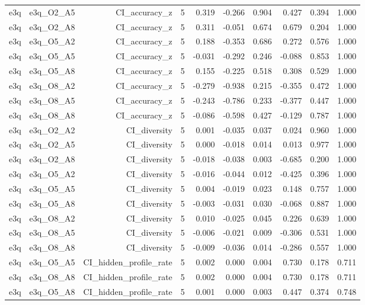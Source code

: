 \documentclass[11pt]{article}
\begin{document}
\begin{landscape}
\begin{longtable}{@{}lrrrrrrrrr@{}}
e3q & e3q\_O2\_A5 & CI\_accuracy\_z & 5 & 0.319 & -0.266 & 0.904 & 0.427 & 0.394 & 1.000 \\
e3q & e3q\_O2\_A8 & CI\_accuracy\_z & 5 & 0.311 & -0.051 & 0.674 & 0.679 & 0.204 & 1.000 \\
e3q & e3q\_O5\_A2 & CI\_accuracy\_z & 5 & 0.188 & -0.353 & 0.686 & 0.272 & 0.576 & 1.000 \\
e3q & e3q\_O5\_A5 & CI\_accuracy\_z & 5 & -0.031 & -0.292 & 0.246 & -0.088 & 0.853 & 1.000 \\
e3q & e3q\_O5\_A8 & CI\_accuracy\_z & 5 & 0.155 & -0.225 & 0.518 & 0.308 & 0.529 & 1.000 \\
e3q & e3q\_O8\_A2 & CI\_accuracy\_z & 5 & -0.279 & -0.938 & 0.215 & -0.355 & 0.472 & 1.000 \\
e3q & e3q\_O8\_A5 & CI\_accuracy\_z & 5 & -0.243 & -0.786 & 0.233 & -0.377 & 0.447 & 1.000 \\
e3q & e3q\_O8\_A8 & CI\_accuracy\_z & 5 & -0.086 & -0.598 & 0.427 & -0.129 & 0.787 & 1.000 \\
e3q & e3q\_O2\_A2 & CI\_diversity & 5 & 0.001 & -0.035 & 0.037 & 0.024 & 0.960 & 1.000 \\
e3q & e3q\_O2\_A5 & CI\_diversity & 5 & 0.000 & -0.018 & 0.014 & 0.013 & 0.977 & 1.000 \\
e3q & e3q\_O2\_A8 & CI\_diversity & 5 & -0.018 & -0.038 & 0.003 & -0.685 & 0.200 & 1.000 \\
e3q & e3q\_O5\_A2 & CI\_diversity & 5 & -0.016 & -0.044 & 0.012 & -0.425 & 0.396 & 1.000 \\
e3q & e3q\_O5\_A5 & CI\_diversity & 5 & 0.004 & -0.019 & 0.023 & 0.148 & 0.757 & 1.000 \\
e3q & e3q\_O5\_A8 & CI\_diversity & 5 & -0.003 & -0.031 & 0.030 & -0.068 & 0.887 & 1.000 \\
e3q & e3q\_O8\_A2 & CI\_diversity & 5 & 0.010 & -0.025 & 0.045 & 0.226 & 0.639 & 1.000 \\
e3q & e3q\_O8\_A5 & CI\_diversity & 5 & -0.006 & -0.021 & 0.009 & -0.306 & 0.531 & 1.000 \\
e3q & e3q\_O8\_A8 & CI\_diversity & 5 & -0.009 & -0.036 & 0.014 & -0.286 & 0.557 & 1.000 \\
e3q & e3q\_O5\_A5 & CI\_hidden\_profile\_rate & 5 & 0.002 & 0.000 & 0.004 & 0.730 & 0.178 & 0.711 \\
e3q & e3q\_O8\_A8 & CI\_hidden\_profile\_rate & 5 & 0.002 & 0.000 & 0.004 & 0.730 & 0.178 & 0.711 \\
e3q & e3q\_O5\_A8 & CI\_hidden\_profile\_rate & 5 & 0.001 & 0.000 & 0.003 & 0.447 & 0.374 & 0.748 \\

\end{longtable}
\end{landscape}
\end{document}

